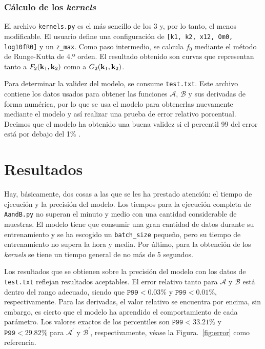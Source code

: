 \documentclass[letterpaper, 12pt]{article}
\begin{document}
            \subsubsection{Cálculo de los \emph{kernels}}
                El archivo \texttt{kernels.py} es el más sencillo de los 3 y, por lo tanto, el menos modificable. El usuario define una configuración de \texttt{[k1, k2, x12, Om0, log10fR0]} y un \texttt{z\_max}. Como paso intermedio, se calcula $f_0$ mediante el método de Runge-Kutta de 4.º orden. El resultado obtenido son curvas que representan tanto a $F_2(\vb{k}_1, \vb{k}_2)$ como a $G_2(\vb{k}_1, \vb{k}_2)$. 

                Para determinar la validez del modelo, se consume \texttt{test.txt}. Este archivo contiene los datos usados para obtener las funciones $\mathcal{A}$, $\mathcal{B}$ y sus derivadas de forma numérica, por lo que se usa el modelo para obtenerlas nuevamente mediante el modelo y así realizar una prueba de error relativo porcentual. Decimos que el modelo ha obtenido una buena validez si el percentil 99 del error está por debajo del 1\% \cite{3}.
        
    \section{Resultados}
        Hay, básicamente, dos cosas a las que se les ha prestado atención: el tiempo de ejecución y la precisión del modelo. Los tiempos para la ejecución completa de \texttt{AandB.py} no superan el minuto y medio con una cantidad considerable de muestras. El modelo tiene que consumir una gran cantidad de datos durante su entrenamiento y se ha escogido un \texttt{batch\_size} pequeño, pero su tiempo de entrenamiento no supera la hora y media. Por último, para la obtención de los \emph{kernels} se tiene un tiempo general de no más de 5 segundos.

        Los resultados que se obtienen sobre la precisión del modelo con los datos de \texttt{test.txt} reflejan resultados aceptables. El error relativo tanto para $\mathcal{A}$ y $\mathcal{B}$ está dentro del rango adecuado, siendo que $\texttt{P99} < 0.03\%$ y $\texttt{P99} < 0.01\%$, respectivamente. Para las derivadas, el valor relativo se encuentra por encima, sin embargo, es cierto que el modelo ha aprendido el comportamiento de cada parámetro. Los valores exactos de los percentiles son $\texttt{P99} < 33.21\%$ y $\texttt{P99} < 29.82\%$ para $\mathcal{A}^{\prime}$ y $\mathcal{B}^{\prime}$, respectivamente, véase la Figura.~\ref{fig:error} como referencia.
\end{document}
